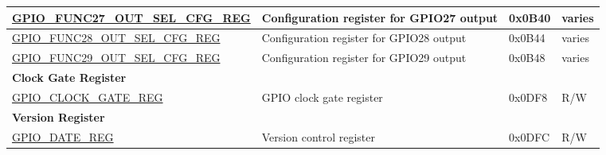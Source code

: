 \begin{longtable}{ | p{5.5cm} | p{6.2cm} | p{1.3cm} | p{2cm} | }
\hyperref[regdesc:GPIOFUNCNOUTSELCFGREG]{GPIO\_FUNC27\_OUT\_SEL\_CFG\_REG} & Configuration register for GPIO27 output & 0x0B40 & varies \\ \hline
\hyperref[regdesc:GPIOFUNCNOUTSELCFGREG]{GPIO\_FUNC28\_OUT\_SEL\_CFG\_REG} & Configuration register for GPIO28 output & 0x0B44 & varies \\ \hline
\hyperref[regdesc:GPIOFUNCNOUTSELCFGREG]{GPIO\_FUNC29\_OUT\_SEL\_CFG\_REG} & Configuration register for GPIO29 output & 0x0B48 & varies \\ \hline
\multicolumn{4}{|l|}{\textbf{Clock Gate Register}} \\ \hline
\hyperref[regdesc:GPIOCLOCKGATEREG]{GPIO\_CLOCK\_GATE\_REG} & GPIO clock gate register & 0x0DF8 & R/W \\ \hline
\multicolumn{4}{|l|}{\textbf{Version Register}} \\ \hline
\hyperref[regdesc:GPIODATEREG]{GPIO\_DATE\_REG} & Version control register & 0x0DFC & R/W \\ \hline
\end{longtable}
